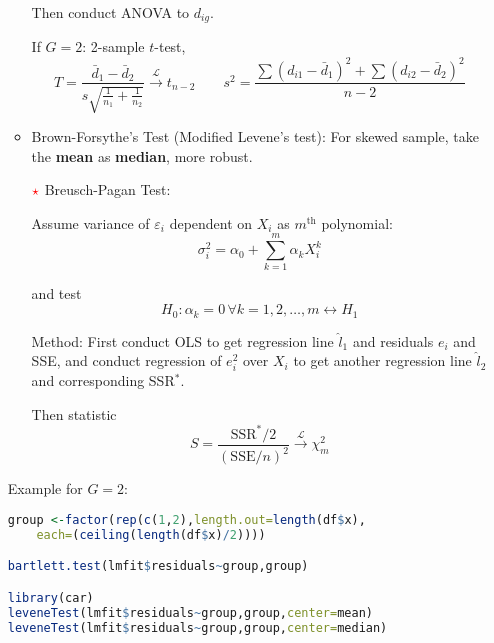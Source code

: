 \begin{itemize}[topsep=2pt,itemsep=2pt]
\begin{itemize}[topsep=2pt,itemsep=2pt]
        Then conduct ANOVA to $ d_{ig} $.

        If $ G=2 $: 2-sample $ t $-test,
        \begin{equation}
            T=\dfrac{\bar{d}_1-\bar{d}_2}{s\sqrt{\frac{1}{n_1}+\frac{1}{n_2}}}\xrightarrow[]{\mathscr{L}} t_{n-2}\qquad s^2=\dfrac{\sum(d_{i1}-\bar{d}_1)^2+\sum(d_{i2}-\bar{d}_2 )^2}{n-2}
        \end{equation}
        

        
        
        \item Brown-Forsythe's Test (Modified Levene's test): For skewed sample, take the \textbf{mean} as \textbf{median}, more robust. 


        \item[$ {\color{red}\star} $] Breusch-Pagan Test:
        
        Assume variance of $ \varepsilon _i $ dependent on $ X_i $ as $ m^{\mathrm{th}} $ polynomial:
        \begin{equation}
            \sigma_i^2=\alpha _0+\sum_{k=1}^m\alpha _kX_i^k
        \end{equation}
        
        and test 
        \begin{equation}
            H_0:\alpha _k=0\,\forall k=1,2,\ldots,m\longleftrightarrow H_1 
        \end{equation}

        Method: First conduct OLS to get regression line $ \hat{l}_1 $ and residuals $ e_i $ and SSE, and conduct regression of $ e_i^2 $ over $ X_i $ to get another regression line $ \hat{l}_2 $ and corresponding SSR$ ^* $.

        Then statistic
        \begin{equation}
            S=\dfrac{\mathrm{SSR^*}/2}{(\mathrm{SSE}/n)^2}\xrightarrow[]{\mathscr{L}} \chi^2_m
        \end{equation}
        
    \end{itemize}
\begin{rcode}
    Example for $ G=2 $:
\begin{lstlisting}[language=R]
group <-factor(rep(c(1,2),length.out=length(df$x),
    each=(ceiling(length(df$x)/2))))

bartlett.test(lmfit$residuals~group,group)

library(car)
leveneTest(lmfit$residuals~group,group,center=mean)
leveneTest(lmfit$residuals~group,group,center=median)


\end{lstlisting}
\end{rcode}
\end{itemize}
